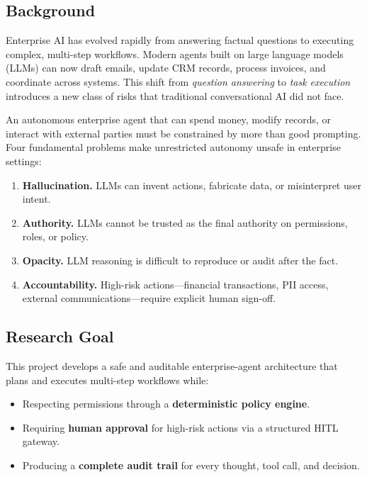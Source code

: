 \documentclass[11pt,a4paper]{article}
\begin{document}
\subsection{Background}

Enterprise AI has evolved rapidly from answering factual questions to executing complex, multi-step workflows. Modern agents built on large language models (LLMs) can now draft emails, update CRM records, process invoices, and coordinate across systems. This shift from \textit{question answering} to \textit{task execution} introduces a new class of risks that traditional conversational AI did not face.

An autonomous enterprise agent that can spend money, modify records, or interact with external parties must be constrained by more than good prompting. Four fundamental problems make unrestricted autonomy unsafe in enterprise settings:

\begin{enumerate}[leftmargin=*, itemsep=2pt]
    \item \textbf{Hallucination.} LLMs can invent actions, fabricate data, or misinterpret user intent.
    \item \textbf{Authority.} LLMs cannot be trusted as the final authority on permissions, roles, or policy.
    \item \textbf{Opacity.} LLM reasoning is difficult to reproduce or audit after the fact.
    \item \textbf{Accountability.} High-risk actions---financial transactions, PII access, external communications---require explicit human sign-off.
\end{enumerate}

\subsection{Research Goal}

This project develops a safe and auditable enterprise-agent architecture that plans and executes multi-step workflows while:

\begin{itemize}[leftmargin=*, itemsep=2pt]
    \item Respecting permissions through a \textbf{deterministic policy engine}.
    \item Requiring \textbf{human approval} for high-risk actions via a structured HITL gateway.
    \item Producing a \textbf{complete audit trail} for every thought, tool call, and decision.
\end{itemize}
\end{document}
